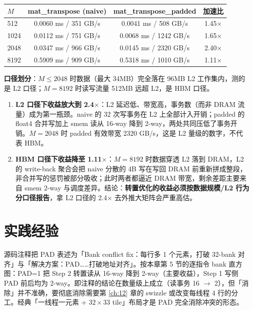 \begin{center}
\begin{tabular}{lccc}
\toprule
$M$ & mat\_transpose (naive) & mat\_transpose\_padded & 加速比 \\
\midrule
512  & 0.0060 ms / 351 GB/s  & 0.0041 ms / 508 GB/s   & 1.45$\times$ \\
1024 & 0.0112 ms / 751 GB/s  & 0.0068 ms / 1242 GB/s  & 1.65$\times$ \\
2048 & 0.0347 ms / 966 GB/s  & 0.0145 ms / 2320 GB/s  & 2.40$\times$ \\
8192 & 0.5909 ms / 909 GB/s  & 0.5318 ms / 1010 GB/s  & 1.11$\times$ \\
\bottomrule
\end{tabular}
\end{center}

\textbf{口径划分}：$M \le 2048$ 时数据（最大 34MB）完全落在 96MB L2 工作集内，测的是 L2 口径；$M = 8192$ 时读写流量 512MB 远超 L2，是 HBM 口径。

\begin{enumerate}
  \item \textbf{L2 口径下收益放大到 2.4$\times$}：L2 延迟低、带宽高，事务数（而非 DRAM 流量）成为第一瓶颈。naive 的 32 次写事务在 L2 上全部计入开销；padded 的 float4 合并写加上 smem 读从 16-way 降到 2-way，两处共同压低了事务开销。$M = 2048$ 时 padded 有效带宽 2320 GB/s，这是 L2 量级的数字，不代表 HBM。
  \item \textbf{HBM 口径下收益降至 1.11$\times$}：$M = 8192$ 时数据穿透 L2 落到 DRAM，L2 的 write-back 聚合会把 naive 分散的 4B 写在写回 DRAM 前重新拼成整段，非合并写的惩罚被部分吸收；此时两者都逼近 DRAM 带宽，剩余差距主要来自 smem 2-way 与调度差异。结论：\textbf{转置优化的收益必须按数据规模/L2 行为分口径报告}，拿 L2 口径的 2.4$\times$ 去外推大矩阵会严重高估。
\end{enumerate}

\section{实践经验}

\begin{kaogu}
源码注释把 PAD 表述为「Bank conflict fix：每行多 1 个元素，打破 32-bank 对齐」与「解决方案：PAD……打破地址对齐」。按本章第 5 节的逐指令 bank 直方图：PAD=1 把 Step 2 转置读从 16-way 降到 2-way（主要收益），Step 1 写侧 PAD 前后均为 2-way。即注释的结论在数量级上成立（读事务 16 $\to$ 2），但「消除」并不准确，要彻底消除需要第 \ref{ch:12} 章的 swizzle 或改变每线程 4 行的分工。经典「一线程一元素 + $32\times33$ tile」布局才是 PAD 完全消除冲突的形态。
\end{kaogu}

